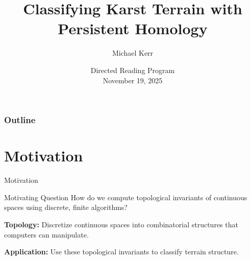 \documentclass{beamer}
\title[Classifying Karst Terrain with Persistent Homology] %
{Classifying Karst Terrain with Persistent Homology}
\author
{Michael Kerr}
\institute[]
{
  University of Georgia \\ Advised By Cameron Thomas 
}
\date[November 19, 2025] %
{Directed Reading Program\\ November 19, 2025}
\begin{document}
\frame{\titlepage}

\begin{frame}
\frametitle{Outline}
\tableofcontents
\end{frame}

\section{Motivation}
\begin{frame}{Motivation}

\begin{alertblock}{Motivating Question}
    How do we compute topological invariants of continuous spaces using discrete, finite algorithms?
\end{alertblock}

\textbf{Topology:} Discretize continuous spaces into combinatorial structures that computers can manipulate.

\textbf{Application:} Use these topological invariants to classify terrain structure.

\end{frame}
\end{document}
